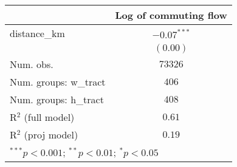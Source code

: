 
\begin{tabular}{l c}
\hline
 & Log of commuting flow \\
\hline
distance\_km          & $-0.07^{***}$ \\
                      & $(0.00)$      \\
\hline
Num. obs.             & $73326$       \\
Num. groups: w\_tract & $406$         \\
Num. groups: h\_tract & $408$         \\
R$^2$ (full model)    & $0.61$        \\
R$^2$ (proj model)    & $0.19$        \\
\hline
\multicolumn{2}{l}{\scriptsize{$^{***}p<0.001$; $^{**}p<0.01$; $^{*}p<0.05$}}
\end{tabular}
